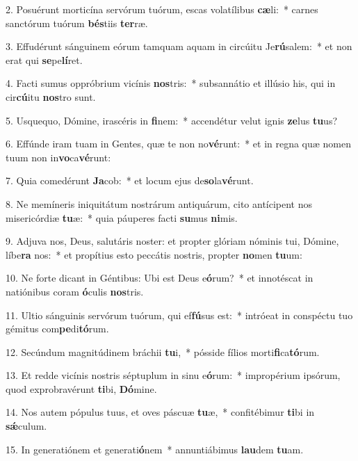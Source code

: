 2. Posuérunt morticína servórum tuórum, escas volatílibus \textbf{cæ}li:~*  carnes sanctórum tuórum \textbf{bés}tiis \textbf{ter}ræ.\

3. Effudérunt sánguinem eórum tamquam aquam in circúitu Je\textbf{rú}salem:~*  et non erat qui \textbf{se}pe\textbf{lí}ret.\

4. Facti sumus oppróbrium vicínis \textbf{nos}tris:~*  subsannátio et illúsio his, qui in cir\textbf{cú}itu \textbf{nos}tro sunt.\

5. Usquequo, Dómine, irascéris in \textbf{fi}nem:~*  accendétur velut ignis \textbf{ze}lus \textbf{tu}us?\

6. Effúnde iram tuam in Gentes, quæ te non no\textbf{vé}runt:~*  et in regna quæ nomen tuum non in\textbf{vo}ca\textbf{vé}runt:\

7. Quia comedérunt \textbf{Ja}cob:~*  et locum ejus de\textbf{so}la\textbf{vé}runt.\

8. Ne memíneris iniquitátum nostrárum antiquárum, cito antícipent nos misericórdiæ \textbf{tu}æ:~*  quia páuperes facti \textbf{su}mus \textbf{ni}mis.\

9. Adjuva nos, Deus, salutáris noster: et propter glóriam nóminis tui, Dómine, líbe\textbf{ra} nos:~*  et propítius esto peccátis nostris, propter \textbf{no}men \textbf{tu}um:\

10. Ne forte dicant in Géntibus: Ubi est Deus e\textbf{ó}rum?~*  et innotéscat in natiónibus coram \textbf{ó}culis \textbf{nos}tris.\

11. Ultio sánguinis servórum tuórum, qui ef\textbf{fú}sus est:~*  intróeat in conspéctu tuo gémitus com\textbf{pe}di\textbf{tó}rum.\

12. Secúndum magnitúdinem bráchii \textbf{tu}i,~*  pósside fílios morti\textbf{fi}ca\textbf{tó}rum.\

13. Et redde vicínis nostris séptuplum in sinu e\textbf{ó}rum:~*  impropérium ipsórum, quod exprobravérunt \textbf{ti}bi, \textbf{Dó}mine.\

14. Nos autem pópulus tuus, et oves páscuæ \textbf{tu}æ,~*  confitébimur \textbf{ti}bi in \textbf{sǽ}culum.\

15. In generatiónem et generati\textbf{ó}nem~*  annuntiábimus \textbf{lau}dem \textbf{tu}am.\

